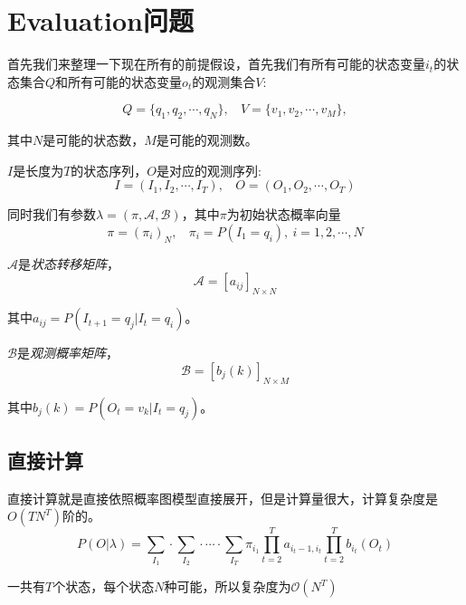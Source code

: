 \chapter{Evaluation问题}

首先我们来整理一下现在所有的前提假设，首先我们有所有可能的状态变量$i_t$的状态集合$Q$和所有可能的状态变量$o_t$的观测集合$V$:

\begin{equation}
    Q=\{q_1,q_2,\cdots,q_N\}, \ \ \ \ V=\{v_1,v_2,\cdots,v_M\},
\end{equation}

其中$N$是可能的状态数，$M$是可能的观测数。

$I$是长度为$T$的状态序列，$O$是对应的观测序列:
\begin{equation}
    I=(I_1,I_2,\cdots,I_T),\ \ \ \ O=(O_1,O_2,\cdots,O_T)
\end{equation}

同时我们有参数$\lambda=(\pi,\mathcal{A},\mathcal{B})$，其中$\pi$为初始状态概率向量
\begin{equation}
    \pi = (\pi_i)_{N},\ \ \ \ \pi_i=P(I_1=q_i),\ i=1,2,\cdots,N
\end{equation}

$\mathcal{A}$是\textsl{状态转移矩阵}，
\begin{equation}
    \mathcal{A}=[a_{ij}]_{N\times N}
\end{equation}

其中$a_{ij}=P(I_{t+1}=q_j|I_t=q_i)$。

$\mathcal{B}$是\textsl{观测概率矩阵}，
\begin{equation}
    \mathcal{B}=[b_j(k)]_{N\times M}
\end{equation}

其中$b_{j}(k)=P(O_{t}=v_k|I_t=q_j)$。



\section{直接计算}

直接计算就是直接依照概率图模型直接展开，但是计算量很大，计算复杂度是$O(TN^T)$阶的。
\begin{equation}
    P(O|\lambda)=\sum_{I_1}\cdot\sum_{I_2}\cdot\cdots\cdot \sum_{I_T}\pi_{i_1}\prod_{t=2}^{T}a_{i_t-1,i_t}\prod_{t=2}^{T}b_{i_t}(O_t)
\end{equation}

一共有$T$个状态，每个状态$N$种可能，所以复杂度为$\mathcal{O}(N^T)$

